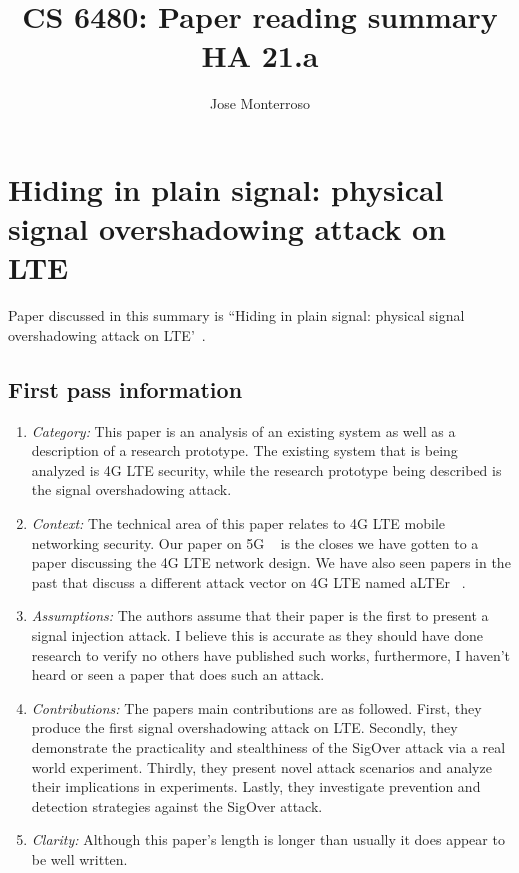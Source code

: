\documentclass[letterpaper,twocolumn,10pt]{article}
\title{CS 6480: Paper reading summary\\
HA 21.a\\}
\author{Jose Monterroso}
\affil{School of Computing, University of Utah}
\begin{document}
\maketitle
\section{Hiding in plain signal: physical signal overshadowing attack on LTE}

Paper discussed in this summary is ``Hiding in plain signal: physical signal overshadowing attack on LTE'~\cite{plainsight}.

\subsection{First pass information}
\label{sec:first}
\begin{enumerate}

\item {\it Category:} 
This paper is an analysis of an existing system as well as a description of a research prototype. The existing system 
that is being analyzed is 4G LTE security, while the research prototype being described is the signal overshadowing attack.

\item {\it Context:}
The technical area of this paper relates to 4G LTE mobile networking security. Our paper on 5G ~\cite{5gwhite}
is the closes we have gotten to a paper discussing the 4G LTE network design. We have also seen papers in the
past that discuss a different attack vector on 4G LTE named aLTEr ~\cite{breakinglte}.

\item {\it Assumptions:}  
The authors assume that their paper is the first to present a signal injection attack. I believe this is accurate as they
should have done research to verify no others have published such works, furthermore, I haven't heard or seen a 
paper that does such an attack.

\item {\it Contributions:} 
The papers main contributions are as followed. First, they produce the first signal overshadowing attack on LTE.
Secondly, they demonstrate the practicality and stealthiness of the SigOver attack via a real world experiment.
Thirdly, they present novel attack scenarios and analyze their implications in experiments. Lastly, they investigate
prevention and detection strategies against the SigOver attack. 

\item {\it Clarity:} Although this paper's length is longer than usually it does appear to be well written.

\end{enumerate}
\end{document}
